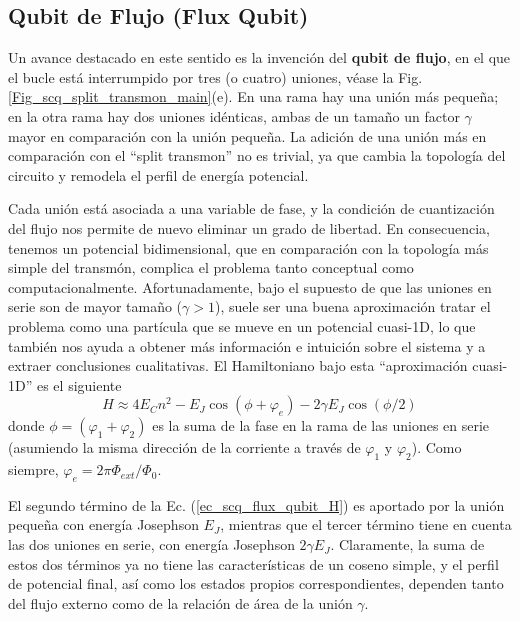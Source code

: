     
    \subsection{Qubit de Flujo (Flux Qubit)} \label{sec_scq_flux_qubits}

    Un avance destacado en este sentido es la invención del \textbf{qubit de flujo}, en el que el bucle  está interrumpido por tres (o cuatro) uniones, véase la Fig. \ref{Fig_scq_split_transmon_main}(e). En una rama hay una unión más pequeña; en la otra rama hay dos uniones idénticas, ambas de un tamaño un factor $\gamma$ mayor en comparación con la unión pequeña. La adición de una unión más en comparación con el ``split transmon'' no es trivial, ya que cambia la topología del circuito y remodela el perfil de energía potencial.

    Cada unión está asociada a una variable de fase, y la condición de cuantización del flujo nos permite de nuevo eliminar un grado de libertad. En consecuencia, tenemos un potencial bidimensional, que en comparación con la topología más simple del transmón, complica el problema tanto conceptual como computacionalmente. Afortunadamente, bajo el supuesto de que las uniones en serie son de mayor tamaño ($\gamma > 1$), suele ser una buena aproximación tratar el problema como una partícula que se mueve en un potencial cuasi-1D, lo que también nos ayuda a obtener más información e intuición sobre el sistema y a extraer conclusiones cualitativas. El Hamiltoniano bajo esta ``aproximación cuasi-1D'' es el siguiente
    \begin{equation} \label{ec_scq_flux_qubit_H}
        H \approx 4 E_C n^2 - E_J \cos (\phi + \varphi_e) - 2 \gamma E_J \cos (\phi/2)
    \end{equation}
    donde $\phi = (\varphi_1 + \varphi_2)$ es la suma de la fase en la rama de las uniones en serie (asumiendo la misma dirección de la corriente a través de $\varphi_1$ y $\varphi_2$). Como siempre, $\varphi_e = 2 \pi \Phi_{ext}/\Phi_0$. 

     El segundo término de la Ec. (\ref{ec_scq_flux_qubit_H}) es aportado por la unión pequeña con energía Josephson $E_J$, mientras que el tercer término tiene en cuenta las dos uniones en serie, con energía Josephson $2 \gamma E_J$. Claramente, la suma de estos dos términos ya no tiene las características de un coseno simple, y el perfil de potencial final, así como los estados propios correspondientes, dependen tanto del flujo externo como de la relación de área de la unión $\gamma$.

